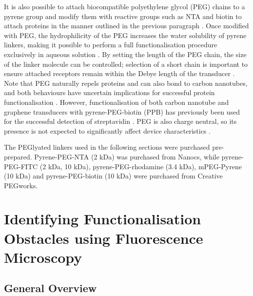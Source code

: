 \documentclass[
  a4paper,
]{scrbook}
\begin{document}
It is also possible to attach biocompatible \autocite{Chen2004}
polyethylene glycol (PEG) chains to a pyrene group and modify them with
reactive groups such as NTA and biotin to attach proteins in the manner
outlined in the previous paragraph
\autocite{Hermanson2013-18,Meran2018}. Once modified with PEG, the
hydrophilicity of the PEG increases the water solubility of pyrene
linkers, making it possible to perform a full functionalisation
procedure exclusively in aqueous solution
\autocite{Chen2004,Hermanson2013-18}. By setting the length of the PEG
chain, the size of the linker molecule can be controlled; selection of a
short chain is important to ensure attached receptors remain within the
Debye length of the transducer \autocite{Shkodra2021}. Note that PEG
naturally repels proteins and can also bond to carbon nanotubes, and
both behaviours have uncertain implications for successful protein
functionalisation \autocite{Chen2004}. However, functionalisation of
both carbon nanotube and graphene transducers with pyrene-PEG-biotin
(PPB) has previously been used for the successful detection of
streptavidin \autocite{Star2003a,Miki2019}. PEG is also charge neutral,
so its presence is not expected to significantly affect device
characteristics \autocite{Chen2004}.

The PEGlyated linkers used in the following sections were purchased
pre-prepared. Pyrene-PEG-NTA (2 kDa) was purchased from Nanocs, while
pyrene-PEG-FITC (2 kDa, 10 kDa), pyrene-PEG-rhodamine (3.4 kDa),
mPEG-Pyrene (10 kDa) and pyrene-PEG-biotin (10 kDa) were purchased from
Creative PEGworks.

\hypertarget{sec-impediments}{%
\section{Identifying Functionalisation Obstacles using Fluorescence
Microscopy}\label{sec-impediments}}

\hypertarget{sec-fluorescence-remarks}{%
\subsection{General Overview}\label{sec-fluorescence-remarks}}
\end{document}
